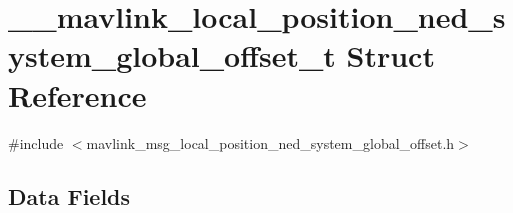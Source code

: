 \hypertarget{struct____mavlink__local__position__ned__system__global__offset__t}{\section{\-\_\-\-\_\-mavlink\-\_\-local\-\_\-position\-\_\-ned\-\_\-system\-\_\-global\-\_\-offset\-\_\-t Struct Reference}
\label{struct____mavlink__local__position__ned__system__global__offset__t}
}


{\ttfamily \#include $<$mavlink\-\_\-msg\-\_\-local\-\_\-position\-\_\-ned\-\_\-system\-\_\-global\-\_\-offset.\-h$>$}

\subsection*{Data Fields}
